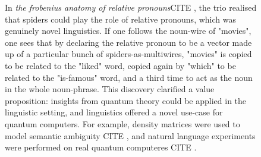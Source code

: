 \begin{figure}[h!]
\centering
{}
\caption{In \emph{the frobenius anatomy of relative pronouns}\bR CITE \e, the trio realised that spiders could play the role of relative pronouns, which was genuinely novel linguistics. If one follows the noun-wire of "movies", one sees that by declaring the relative pronoun to be a vector made up of a particular bunch of spiders-as-multiwires, "movies" is copied to be related to the "liked" word, copied again by "which" to be related to the "is-famous" word, and a third time to act as the noun in the whole noun-phrase. This discovery clarified a value proposition: insights from quantum theory could be applied in the linguistic setting, and linguistics offered a novel use-case for quantum computers. For example, density matrices were used to model semantic ambiguity \bR CITE \e, and natural language experiments were performed on real quantum computeres \bR CITE \e.}
\end{figure}

